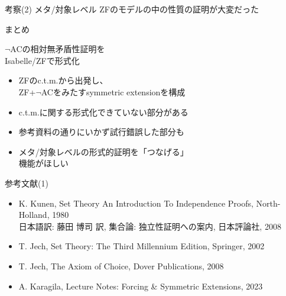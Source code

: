 \documentclass[17pt]{beamer}
\begin{document}
\begin{frame}{考察(2) メタ/対象レベル}
    \hspace{-0.5cm}ZFのモデルの中の性質の証明が大変だった
\end{frame}

\begin{frame}{まとめ}
    \begin{center}
        $\neg$ACの相対無矛盾性証明を\\
        Isabelle/ZFで形式化
    \end{center}
    {\small
    \begin{itemize}[itemsep=8pt]
        \item ZFのc.t.m.から出発し、\\ZF+$\neg$ACをみたすsymmetric extensionを構成
        \item c.t.m.に関する形式化できていない部分がある
        \item 参考資料の通りにいかず試行錯誤した部分も
        \item メタ/対象レベルの形式的証明を「つなげる」\\機能がほしい
    \end{itemize}
    }
\end{frame}

\appendix
{}
 
\begin{frame}{参考文献(1)}
    \vspace{-30pt}
    \, {\footnotesize 
    \begin{itemize}[itemsep=5pt, left=0pt]
        \item K. Kunen, Set Theory An Introduction To Independence Proofs, North-Holland, 1980 \\
              日本語訳: 藤田 博司 訳, 集合論: 独立性証明への案内, 日本評論社, 2008
        \item T. Jech, Set Theory: The Third Millennium Edition, Springer, 2002
        \item T. Jech, The Axiom of Choice, Dover Publications, 2008
        \item A. Karagila, Lecture Notes: Forcing \& Symmetric Extensions, 2023
    \end{itemize}
    }

\end{frame}
\end{document}
